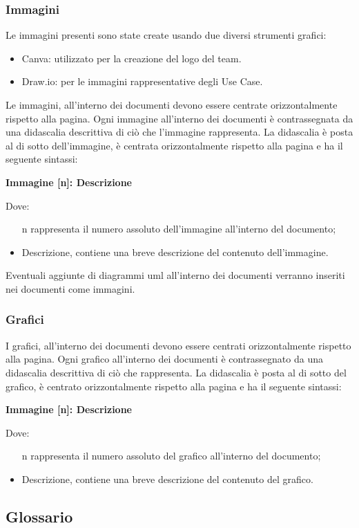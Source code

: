 \documentclass{article}
\begin{document}
\subsubsection{Immagini}
Le immagini presenti sono state create usando due diversi strumenti grafici:
\begin{itemize}
    \item Canva: utilizzato per la creazione del logo del team. 
    \item Draw.io: per le immagini rappresentative degli Use Case.
\end{itemize}
Le immagini, all’interno dei documenti devono essere centrate orizzontalmente rispetto alla pagina.
Ogni immagine all’interno dei documenti è contrassegnata da una didascalia descrittiva di ciò che
l’immagine rappresenta. La didascalia è posta al di sotto dell’immagine, è centrata orizzontalmente
rispetto alla pagina e ha il seguente sintassi:
\begin{center}
\textbf{Immagine [n]: Descrizione}
\end{center}
Dove:
\begin{itemize}
    \item [n] rappresenta il numero assoluto dell’immagine all’interno del documento;
    \item Descrizione, contiene una breve descrizione del contenuto dell’immagine.
\end{itemize}
Eventuali aggiunte di diagrammi uml all’interno dei documenti verranno inseriti nei documenti come
immagini.
\subsubsection{Grafici}
I grafici, all’interno dei documenti devono essere centrati orizzontalmente rispetto alla pagina.
Ogni grafico all’interno dei documenti è contrassegnato da una didascalia descrittiva di ciò che rappresenta. La didascalia è posta al di sotto del grafico, è centrato orizzontalmente
rispetto alla pagina e ha il seguente sintassi:
\begin{center}
\textbf{Immagine [n]: Descrizione}
\end{center}
Dove:
\begin{itemize}
    \item [n] rappresenta il numero assoluto del grafico all’interno del documento;
    \item Descrizione, contiene una breve descrizione del contenuto del grafico.
\end{itemize}
\subsection*{Glossario}
\end{document}

